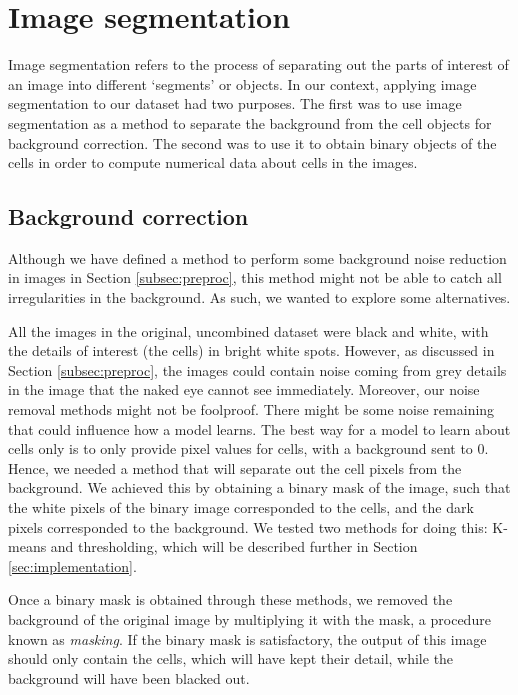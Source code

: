 \section{Image segmentation}

Image segmentation refers to the process of separating out the parts of interest of an image into different `segments' or objects. In our context, applying image segmentation to our dataset had two purposes. The first was to use image segmentation as a method to separate the background from the cell objects for background correction. The second was to use it to obtain binary objects of the cells in order to compute numerical data about cells in the images.

\subsection{Background correction} \label{subsec:correction}

Although we have defined a method to perform some background noise reduction in images in Section \ref{subsec:preproc}, this method might not be able to catch all irregularities in the background. As such, we wanted to explore some alternatives.

All the images in the original, uncombined dataset were black and white, with the details of interest (the cells) in bright white spots. However, as discussed in Section \ref{subsec:preproc}, the images could contain noise coming from grey details in the image that the naked eye cannot see immediately. Moreover, our noise removal methods might not be foolproof. There might be some noise remaining that could influence how a model learns. The best way for a model to learn about cells only is to only provide pixel values for cells, with a background sent to 0. Hence, we needed a method that will separate out the cell pixels from the background. We achieved this by obtaining a binary mask of the image, such that the white pixels of the binary image corresponded to the cells, and the dark pixels corresponded to the background. We tested two methods for doing this: K-means and thresholding, which will be described further in Section \ref{sec:implementation}.

Once a binary mask is obtained through these methods, we removed the background of the original image by multiplying it with the mask, a procedure known as \textit{masking}. If the binary mask is satisfactory, the output of this image should only contain the cells, which will have kept their detail, while the background will have been blacked out.

